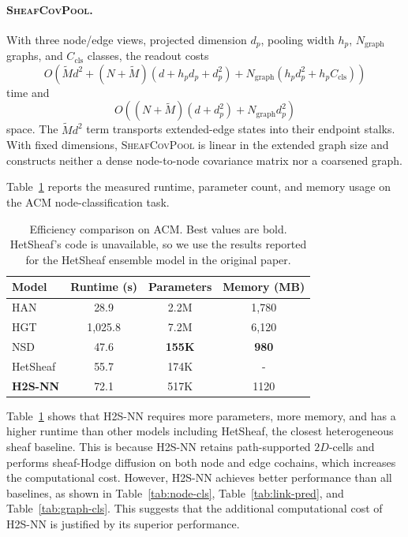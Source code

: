 \documentclass[sigconf,anonymous,review]{acmart}
\newcommand{\method}{\textsc{H2S-NN}}
\newcommand{\sheafcovpool}{\textsc{SheafCovPool}}
\begin{document}
\paragraph{\sheafcovpool{}.}
With three node/edge views, projected dimension \(d_p\), pooling width \(h_p\),
\(N_{\mathrm{graph}}\) graphs, and \(C_{\mathrm{cls}}\) classes, the readout costs
\[
O\!\left(
\widetilde M d^2
+(N+\widetilde M)(d+h_pd_p+d_p^2)
+N_{\mathrm{graph}}(h_pd_p^2+h_pC_{\mathrm{cls}})
\right)
\]
time and
\[
O\!\left((N+\widetilde M)(d+d_p^2)+N_{\mathrm{graph}}d_p^2\right)
\]
space. The \(\widetilde M d^2\) term transports extended-edge states into
their endpoint stalks. With fixed dimensions, \sheafcovpool{} is linear in
the extended graph size and constructs neither a dense node-to-node
covariance matrix nor a coarsened graph.

Table~\ref{tab:efficiency} reports the measured runtime, parameter count, and memory usage on the
ACM node-classification task.

\begin{table}[htbp]
  \centering
  \caption{Efficiency comparison on ACM. Best values are bold. HetSheaf's code is unavailable, so we use the results reported for the HetSheaf ensemble model in the original paper.}
  \label{tab:efficiency}
  \scriptsize
  \begin{tabular}{lccc}
    \toprule
    \textbf{Model} & Runtime (s) & Parameters & Memory (MB) \\
    \midrule
    HAN & 28.9 & 2.2M & 1{,}780 \\
    HGT & 1{,}025.8 & 7.2M & 6{,}120 \\
    NSD & 47.6 & \textbf{155K} & \textbf{980} \\
    HetSheaf & 55.7 & 174K & - \\
    \midrule
    \textbf{\method{}} & 72.1 & 517K & 1120 \\
    \bottomrule
  \end{tabular}
\end{table}

Table~\ref{tab:efficiency} shows that \method{} requires more parameters, more memory, and has a higher runtime than other models including HetSheaf, the closest heterogeneous sheaf baseline. This is because \method{} retains path-supported \(2D\)-cells and performs sheaf-Hodge diffusion on both node and edge cochains, which increases the computational cost. However, \method{} achieves better performance than all baselines, as shown in Table~\ref{tab:node-cls}, Table~\ref{tab:link-pred}, and Table~\ref{tab:graph-cls}. This suggests that the additional computational cost of \method{} is justified by its superior performance.
\end{document}
